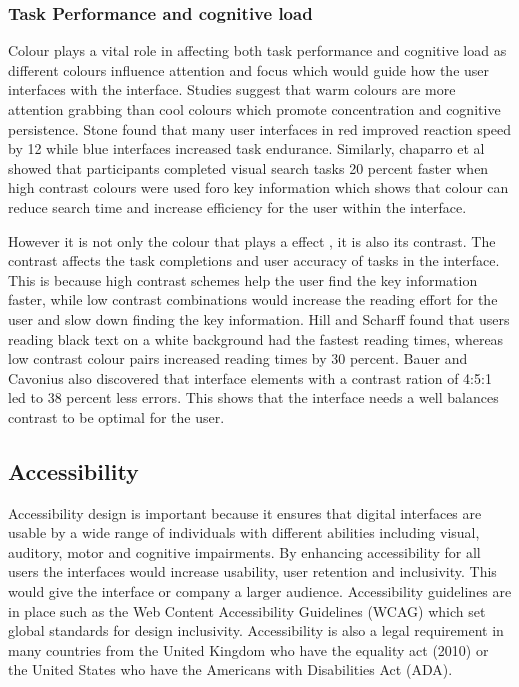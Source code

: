 \documentclass[]{project_final}
\begin{document}
\subsubsection{Task Performance and cognitive load}

Colour plays a vital role in affecting both task performance and cognitive load as different colours influence attention and focus which would guide how the user interfaces with the interface. Studies suggest that warm colours are more attention grabbing than cool colours which promote concentration and cognitive persistence. Stone found that many user interfaces in red improved reaction speed by 12 while blue interfaces increased task endurance. Similarly, chaparro et al showed that participants completed visual search tasks 20 percent faster when high contrast colours were used foro key information which shows that colour can reduce search time and increase efficiency for the user within the interface.

However it is not only the colour that plays a effect , it is also its contrast. The contrast affects the task completions and user accuracy of tasks in the interface. This is because high contrast schemes help the user find the key information faster, while low contrast combinations would increase the reading effort for the user and slow down finding the key information. Hill and Scharff found that users reading black text on a white background had the fastest reading times, whereas low contrast colour pairs increased reading times by 30 percent. Bauer and Cavonius also discovered that interface elements with a  contrast ration of 4:5:1 led to 38 percent less errors. This shows that the interface needs a well balances contrast to be optimal for the user.

\subsection{Accessibility}
Accessibility design is important because it ensures that digital interfaces are usable by a wide range of individuals with different abilities including visual, auditory, motor and cognitive impairments. By enhancing accessibility for all users the interfaces would increase usability, user retention and inclusivity. This would give the interface or company a larger audience. Accessibility guidelines are in place such as the Web Content Accessibility Guidelines (WCAG) which set global standards for design inclusivity. Accessibility is also a legal requirement in many countries from the United Kingdom who have the equality act (2010) or the United States who have the Americans with Disabilities Act (ADA).
\end{document}
